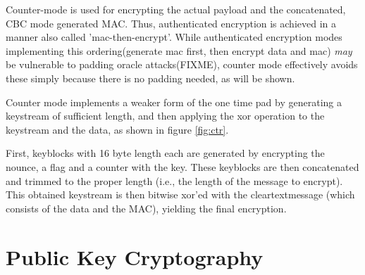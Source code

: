 Counter-mode is used for encrypting the actual payload and the concatenated, CBC mode generated MAC.
Thus, authenticated encryption is achieved in a manner also called 'mac-then-encrypt'. While authenticated
encryption modes implementing this ordering(generate mac first, then encrypt data and mac) \textit{may}
be vulnerable to padding oracle attacks(FIXME), counter mode effectively avoids these simply because
there is no padding needed, as will be shown.

Counter mode implements a weaker form of the one time pad by generating a keystream of sufficient
length, and then applying the \gls{xor} operation to the keystream and the data, as shown in figure \ref{fig:ctr}.


First, keyblocks with 16 byte length each are generated by encrypting the nounce, a flag and a counter with the key. These 
keyblocks are then concatenated and trimmed to the proper length (i.e., the length of the message to encrypt). This obtained keystream
is then bitwise \gls{xor}'ed with the cleartextmessage (which consists of the data and the MAC), yielding the final encryption.


\section{Public Key Cryptography}\label{pkc}

